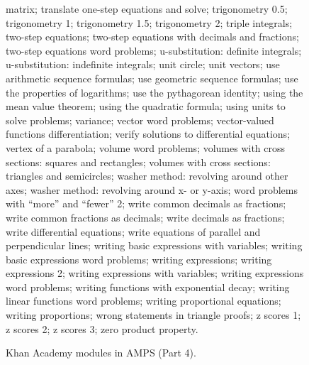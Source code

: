 \documentclass{article}
\begin{document}
\begin{figure*}
matrix; translate one-step equations and solve; trigonometry 0.5; trigonometry 1; trigonometry 1.5; trigonometry 2; triple integrals; two-step equations; two-step equations with decimals and fractions; two-step equations word problems; u-substitution: definite integrals; u-substitution: indefinite integrals; unit circle; unit vectors; use arithmetic sequence formulas; use geometric sequence formulas; use the properties of logarithms; use the pythagorean identity; using the mean value theorem; using the quadratic formula; using units to solve problems; variance; vector word problems; vector-valued functions differentiation; verify solutions to differential equations; vertex of a parabola; volume word problems; volumes with cross sections: squares and rectangles; volumes with cross sections: triangles and semicircles; washer method: revolving around other axes; washer method: revolving around x- or y-axis; word problems with ``more'' and ``fewer'' 2; write common decimals as fractions; write common fractions as decimals; write decimals as fractions; write differential equations; write equations of parallel and perpendicular lines; writing basic expressions with variables; writing basic expressions word problems; writing expressions; writing expressions 2; writing expressions with variables; writing expressions word problems; writing functions with exponential decay; writing linear functions word problems; writing proportional equations; writing proportions; wrong statements in triangle proofs; z scores 1; z scores 2; z scores 3; zero product property.
    \caption{Khan Academy modules in AMPS (Part 4).}
    \label{fig:khan4}
\end{figure*} 
\end{document}
